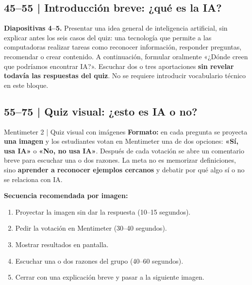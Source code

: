 \documentclass[11pt,a4paper]{article}
\begin{document}
\subsection{45--55 | Introducción breve: ¿qué es la IA?}
\textbf{Diapositivas 4--5.} Presentar una idea general de inteligencia artificial, sin explicar antes los seis casos del quiz: una tecnología que permite a las computadoras realizar tareas como reconocer información, responder preguntas, recomendar o crear contenido. A continuación, formular oralmente «¿Dónde creen que podríamos encontrar IA?». Escuchar dos o tres aportaciones \textbf{sin revelar todavía las respuestas del quiz}. No se requiere introducir vocabulario técnico en este bloque.

\subsection{55--75 | Quiz visual: ¿esto es IA o no?}
\begin{actividad}{Mentimeter 2 | Quiz visual con imágenes}
\textbf{Formato:} en cada pregunta se proyecta \textbf{una imagen} y los estudiantes votan en Mentimeter una de dos opciones: \textbf{«Sí, usa IA»} o \textbf{«No, no usa IA»}. Después de cada votación se abre un comentario breve para escuchar una o dos razones. La meta no es memorizar definiciones, sino \textbf{aprender a reconocer ejemplos cercanos} y debatir por qué algo sí o no se relaciona con IA.

\textbf{Secuencia recomendada por imagen:}
\begin{enumerate}
\item Proyectar la imagen sin dar la respuesta (10--15 segundos).
\item Pedir la votación en Mentimeter (30--40 segundos).
\item Mostrar resultados en pantalla.
\item Escuchar una o dos razones del grupo (40--60 segundos).
\item Cerrar con una explicación breve y pasar a la siguiente imagen.
\end{enumerate}
\end{actividad}
\end{document}
